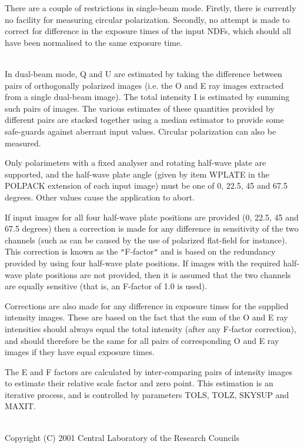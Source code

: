 \documentclass[twoside,11pt]{article}
\renewcommand{\_}{\texttt{\symbol{95}}}
\newcommand{\sstdiytopic}[2]{\item[{\hspace{-0.35em}#1\hspace{-0.35em}:}]
\mbox{} \\[1.3ex] #2}
\newcommand{\sstdiytopic}[2]{\item[{#1}] #2 }
\begin{document}
{{      There are a couple of restrictions in single-beam mode. Firstly,
      there is currently no facility for measuring circular
      polarization. Secondly, no attempt is made to correct for
      difference in the exposure times of the input NDFs, which
      should all have been normalised to the same exposure time.
   }
   \sstdiytopic{
      The Dual-beam Algorithm
   }{
      In dual-beam mode, Q and U are estimated by taking the difference
      between pairs of orthogonally polarized images (i.e. the O and E
      ray images extracted from a single dual-beam image). The total
      intensity I is estimated by summing such pairs of images. The
      various estimates of these quantities provided by different pairs
      are stacked together using a median estimator to provide some
      safe-guards against aberrant input values. Circular polarization
      can also be measured.

      Only polarimeters with a fixed analyser and rotating half-wave plate
      are supported, and the half-wave plate angle (given by item
      WPLATE in the POLPACK extension of each input image) must be one
      of 0, 22.5, 45 and 67.5 degrees. Other values cause the
      application to abort.

      If input images for all four half-wave plate positions are
      provided (0, 22.5, 45 and 67.5 degrees) then a correction is
      made for any difference in sensitivity of the two channels (such
      as can be caused by the use of polarized flat-field for
      instance). This correction is known as the {\tt "}F-factor{\tt "} and is
      based on the redundancy provided by using four half-wave plate
      positions. If images with the required half-wave plate positions
      are not provided, then it is assumed that the two channels are
      equally sensitive (that is, an F-factor of 1.0 is used).

      Corrections are also made for any difference in exposure times
      for the supplied intensity images. These are based on the fact
      that the sum of the O and E ray intensities should always equal
      the total intensity (after any F-factor correction), and should
      therefore be the same for all pairs of corresponding O and E ray
      images if they have equal exposure times.

      The E and F factors are calculated by inter-comparing pairs of
      intensity images to estimate their relative scale factor and
      zero point. This estimation is an iterative process, and is
      controlled by parameters TOLS, TOLZ, SKYSUP and MAXIT.
   }
   \sstdiytopic{
      Copyright
   }{
      Copyright (C) 2001 Central Laboratory of the Research Councils
   }
}
\end{document}
